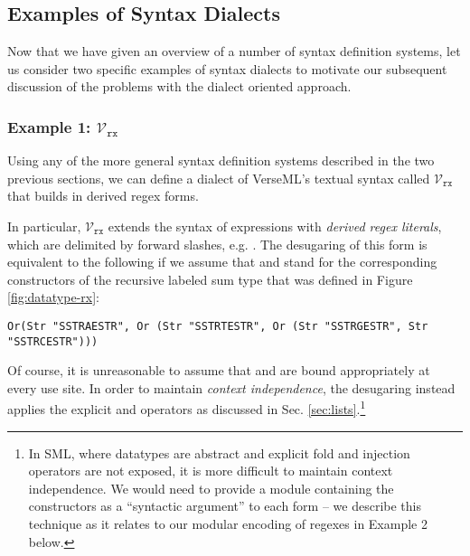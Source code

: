 
\vspace{-8px}\subsection{Examples of Syntax Dialects}\label{sec:examples-of-syntax-dialects}\vspace{-4px}
Now that we have given an overview of a number of syntax definition systems, let us consider two specific examples of syntax dialects to motivate our subsequent discussion of the problems with the dialect oriented approach.

\vspace{-10px}\subsubsection{Example 1: $\mathcal{V}_\texttt{rx}$}
Using any of the more general syntax definition systems described in the two previous sections, we can define a dialect of VerseML's textual syntax called  $\mathcal{V}_\texttt{rx}$ that builds in derived regex forms.

In particular, $\mathcal{V}_\texttt{rx}$ extends the syntax of expressions with  \emph{derived regex literals}, which are delimited by forward slashes, e.g. . The desugaring of this form is equivalent to the following if we assume that  and  stand for the corresponding constructors of the recursive labeled sum type  that was defined in Figure \ref{fig:datatype-rx}:
\begin{lstlisting}[numbers=none]
Or(Str "SSTRAESTR", Or (Str "SSTRTESTR", Or (Str "SSTRGESTR", Str "SSTRCESTR")))
\end{lstlisting}
Of course, it is unreasonable to assume that  and  are bound appropriately at every use site. In order to maintain \emph{context independence}, the desugaring instead applies the explicit  and  operators as discussed in Sec. \ref{sec:lists}.\footnote{In SML, where datatypes are abstract and explicit fold and injection operators are not exposed, it is more difficult to maintain context independence. We would need to provide a module containing the constructors as a ``syntactic argument'' to each form -- we describe this technique as it relates to our modular encoding of regexes in Example 2 below.}

